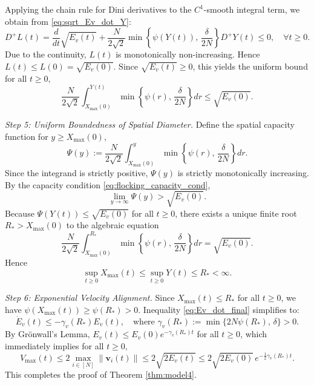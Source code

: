 \documentclass[11pt]{amsart}
\numberwithin{equation}{section}
\begin{document}
Applying the chain rule for Dini derivatives to the $C^1$-smooth integral term, we obtain from \eqref{eq:sqrt_Ev_dot_Y}:
\begin{equation*}\label{eq:Dini_L_nonpositive}
D^+ L(t) = \frac{d}{dt}\sqrt{E_v(t)} + \frac{N}{2\sqrt{2}} \min\left\{\psi(Y(t)),\, \frac{\delta}{2N}\right\} D^+ Y(t) \le 0, \quad \forall t \ge 0.
\end{equation*}
Due to the continuity, $L(t)$ is monotonically non-increasing. Hence $L(t) \le L(0) = \sqrt{E_v(0)}$.
Since $\sqrt{E_v(t)} \ge 0$, this yields the uniform bound for all $t \ge 0,$
\begin{equation*}\label{eq:integral_bound}
\frac{N}{2\sqrt{2}} \int_{X_{\max}(0)}^{Y(t)} \min\left\{\psi(r),\, \frac{\delta}{2N}\right\} dr \le \sqrt{E_v(0)}.
\end{equation*}

\noindent\textit{Step 5: Uniform Boundedness of Spatial Diameter.}
Define the spatial capacity function for $y \ge X_{\max}(0),$
$$
\Psi(y) := \frac{N}{2\sqrt{2}} \int_{X_{\max}(0)}^{y} \min\left\{\psi(r),\, \frac{\delta}{2N}\right\} dr.
$$
Since the integrand is strictly positive, $\Psi(y)$ is strictly monotonically increasing.
By the capacity condition \eqref{eq:flocking_capacity_cond},
$$
\lim_{y \to \infty} \Psi(y) > \sqrt{E_v(0)}.
$$
Because $\Psi(Y(t)) \le \sqrt{E_v(0)}$ for all $t \ge 0$, there exists a unique finite root $R_* > X_{\max}(0)$ to the algebraic equation
\begin{equation*}\label{eq:R_star_def}
\frac{N}{2\sqrt{2}} \int_{X_{\max}(0)}^{R_*} \min \left\{ \psi(r),\, \frac{\delta}{2N} \right\} dr = \sqrt{E_v(0)}.
\end{equation*}
Hence
\begin{equation*}\label{eq:Xmax_global_bound}
\sup_{t \ge 0} X_{\max}(t) \le \sup_{t \ge 0} Y(t) \le R_* < \infty.
\end{equation*}

\noindent\textit{Step 6: Exponential Velocity Alignment.}
Since $X_{\max}(t) \le R_*$ for all $t \ge 0$, we have $\psi(X_{\max}(t)) \ge \psi(R_*) > 0$. Inequality \eqref{eq:Ev_dot_final} simplifies to:
\begin{equation*}\label{eq:Ev_exponential}
\dot{E}_v(t) \le -\gamma_v(R_*) E_v(t), \quad \text{where } \gamma_v(R_*) := \min\bigl\{2N\psi(R_*),\, \delta\bigr\} > 0.
\end{equation*}
By Gr\"onwall's Lemma, $E_v(t) \le E_v(0) e^{-\gamma_v(R_*) t}$ for all $t \ge 0$, which immediately implies for all $t \ge 0,$
\begin{equation*}
V_{\max}(t) \le 2\max_{i\in[N]}\|\boldsymbol{v}_i(t)\| \le 2\sqrt{2E_v(t)} \le 2\sqrt{2E_v(0)}\, e^{-\frac{1}{2}\gamma_v(R_*) t}.
\end{equation*}
This completes the proof of Theorem \ref{thm:model4}.
\end{document}
